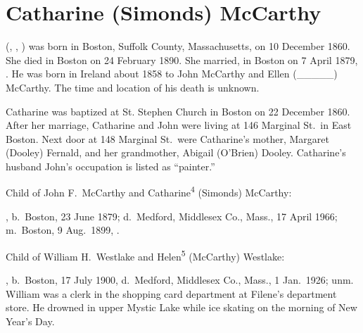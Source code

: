 \section{Catharine (Simonds) McCarthy}

 (, , ) was born in Boston, Suffolk County, Massachusetts, on 10 December 1860.\cite{Catharine4SimondsBirth} She died in Boston on 24 February 1890.\cite{Catharine4SimondsDeath} She married, in Boston on 7 April 1879, .\cite{JohnMcCarthyMarriage} He was born in Ireland about 1858 to John McCarthy and Ellen (\_\_\_\_\_) McCarthy.\cite{JohnMcCarthyMarriage} The time and location of his death is unknown.

Catharine was baptized at St. Stephen Church in Boston on 22 December 1860.\cite{Catharine4SimondsBaptism} After her marriage, Catharine and John were living at 146 Marginal St.\ in East Boston. Next door at 148 Marginal St.\ were Catharine's mother, Margaret (Dooley) Fernald, and her grandmother, Abigail (O'Brien) Dooley. Catharine's husband John's occupation is listed as ``painter.''\cite{Census1880Catharine4Simonds}

\begin{KidsIntro}
	Child of John F.\ McCarthy and Catharine\textsuperscript{4} (Simonds) McCarthy:
\end{KidsIntro}

\begin{Kids}
	, b.\ Boston, 23 June 1879;\cite{Helen5McCarthyBirth} d.\ Medford, Middlesex Co., Mass., 17 April 1966;\cite{Helen5McCarthyDeath} m.\ Boston, 9 Aug.\ 1899, .\cite{Helen5McCarthyMarriage}

\begin{GrandkidsIntro}
	Child of William H.\ Westlake and Helen\textsuperscript{5} (McCarthy) Westlake:
\end{GrandkidsIntro}

\begin{Grandkids}		
	, b.\ Boston, 17 July 1900,\cite{William5WestlakeBirth} d.\ Medford, Middlesex Co., Mass., 1 Jan.\ 1926; unm.\cite{William5WestlakeDeath} William was a clerk in the shopping card department at Filene's department store. He drowned in upper Mystic Lake while ice skating on the morning of New Year's Day.\cite{William5WestlakeDeath}
\end{Grandkids}

\end{Kids}


